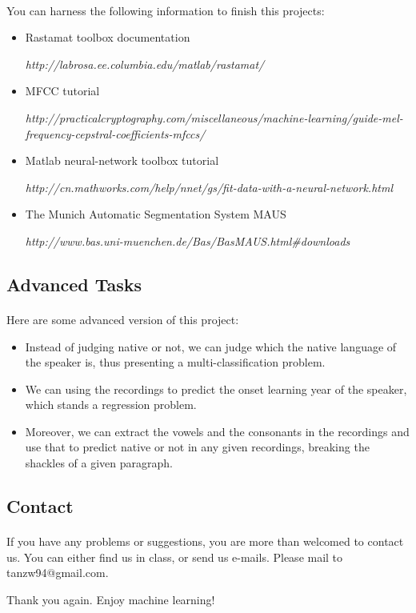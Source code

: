 \paragraph{}
You can harness the following information to finish this projects:
\begin{itemize}
	\item Rastamat toolbox documentation
	
	\emph{http://labrosa.ee.columbia.edu/matlab/rastamat/}
	
	\item MFCC tutorial
	
	\emph{http://practicalcryptography.com/miscellaneous/machine-learning/guide-mel-frequency-cepstral-coefficients-mfccs/}
	
	\item Matlab neural-network toolbox tutorial
	
	\emph{http://cn.mathworks.com/help/nnet/gs/fit-data-with-a-neural-network.html}
	
	\item The Munich Automatic Segmentation System MAUS
	
	\emph{http://www.bas.uni-muenchen.de/Bas/BasMAUS.html\#downloads}
	
\end{itemize}



\subsection{Advanced Tasks}
\paragraph{}
Here are some advanced version of this project:
\begin{itemize}
	\item Instead of judging native or not, we can judge which the native language of the speaker is, thus presenting a multi-classification problem.
	\item We can using the recordings to predict the onset learning year of the speaker, which stands a regression problem.
	\item Moreover, we can extract the vowels and the consonants in the recordings and use that to predict native or not in any given recordings, breaking the shackles of a given paragraph.
\end{itemize}


\subsection{Contact}
\paragraph{}
If you have any problems or suggestions, you are more than welcomed to contact us. You can either find us in class, or send us e-mails. Please mail to tanzw94@gmail.com.

Thank you again. Enjoy machine learning!





